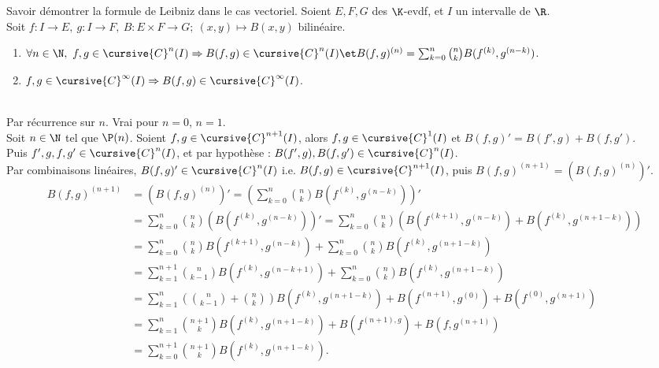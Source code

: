 \documentclass[french, 11pt]{article}
\begin{document}
\begin{exercice}{}{}
    Savoir démontrer la formule de Leibniz dans le cas vectoriel.
    \tcblower
    Soient $E,F,G$ des $\K$-evdf, et $I$ un intervalle de $\R$.\\
    Soit $f:I\to E, ~ g:I\to F, ~ B:E\times F \to G; ~ (x,y)\mapsto B(x,y)$ bilinéaire.
    \begin{enumerate}
        \item $\forall n \in \N, ~ f,g\in\cursive{C}^n(I) \Rightarrow B(f,g)\in\cursive{C}^n(I) \et B(f,g)^{(n)}=\sum_{k=0}^n\binom{n}{k}B(f^{(k)},g^{(n-k)})$.
        \item $f,g\in\cursive{C}^{\infty}(I)\Rightarrow B(f,g)\in\cursive{C}^{\infty}(I)$.
    \end{enumerate}
    \\
    Par récurrence sur $n$. Vrai pour $n=0$, $n=1$.\\
    Soit $n\in\N$ tel que $\P(n)$. Soient $f,g\in\cursive{C}^{n+1}(I)$, alors $f,g\in\cursive{C}^1(I)$ et $B(f,g)'=B(f',g)+B(f,g')$.\\
    Puis $f',g,f,g'\in\cursive{C}^n(I)$, et par hypothèse : $B(f',g),B(f,g')\in\cursive{C}^n(I)$.\\
    Par combinaisons linéaires, $B(f,g)'\in\cursive{C}^n(I)$ i.e. $B(f,g)\in\cursive{C}^{n+1}(I)$, puis $B(f,g)^{(n+1)}=(B(f,g)^{(n)})'$.
    \begin{align*}
        B(f,g)^{(n+1)} &= (B(f,g)^{(n)})' = \left( \sum_{k=0}^n\binom{n}{k}B(f^{(k)}, g^{(n-k)}) \right)'\\
        &=\sum_{k=0}^n\binom{n}{k}\left( B(f^{(k)}, g^{(n-k)}) \right) ' = \sum_{k=0}^n\binom{n}{k}(B(f^{(k+1)},g^{(n-k)}) + B(f^{(k)}, g^{(n+1-k)}))\\
        &=\sum_{k=0}^n\binom{n}{k}B(f^{(k+1)},g^{(n-k)})+\sum_{k=0}^n\binom{n}{k}B(f^{(k)},g^{(n+1-k)})\\
        &=\sum_{k=1}^{n+1}\binom{n}{k-1}B(f^{(k)}, g^{(n-k+1)}) + \sum_{k=0}^n\binom{n}{k}B(f^{(k)},g^{(n+1-k)})\\
        &=\sum_{k=1}^n\left( \binom{n}{k-1} + \binom{n}{k} \right)B(f^{(k)},g^{(n+1-k)}) + B(f^{(n+1)}, g^{(0)}) + B(f^{(0)}, g^{(n+1)})\\
        &=\sum_{k=1}^n\binom{n+1}{k}B(f^{(k)},g^{(n+1-k)}) + B(f^{(n+1),g}) + B(f,g^{(n+1)})\\
        &=\sum_{k=0}^{n+1}\binom{n+1}{k}B(f^{(k)},g^{(n+1-k)}).
    \end{align*} 
\end{exercice}
\end{document}
